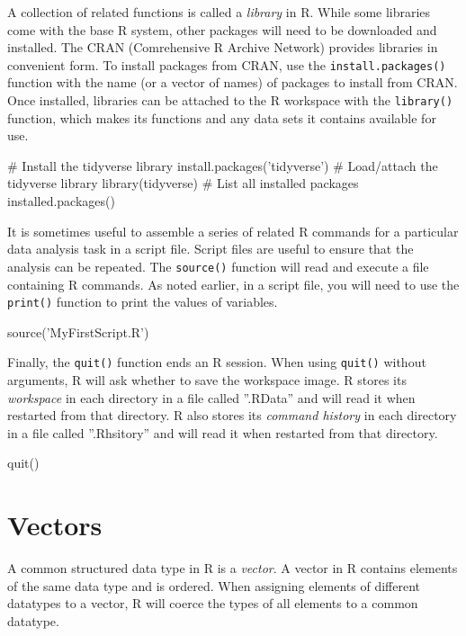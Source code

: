 A collection of related functions is called a \emph{library} in R. While some libraries come with the base R system, other packages will need to be downloaded and installed. The CRAN (Comrehensive R Archive Network) provides libraries in convenient form. To install packages from CRAN, use the \texttt{install.packages()} function with the name (or a vector of names) of packages to install from CRAN. Once installed, libraries can be attached to the R workspace with the \texttt{library()} function, which makes its functions and any data sets it contains available for use. 

\begin{Rcode}
# Install the tidyverse library
install.packages('tidyverse')
# Load/attach the tidyverse library
library(tidyverse)
# List all installed packages
installed.packages()
\end{Rcode}

It is sometimes useful to assemble a series of related R commands for a particular data analysis task in a script file. Script files are useful to ensure that the analysis can be repeated. The \texttt{source()} function will read and execute a file containing R commands. As noted earlier, in a script file, you will need to use the \texttt{print()} function to print the values of variables.

\begin{Rcode}
source('MyFirstScript.R')
\end{Rcode}

Finally, the \texttt{quit()} function ends an R session. When using \texttt{quit()} without arguments, R will ask whether to save the workspace image. R stores its \emph{workspace} in each directory in a file called ''.RData'' and will read it when restarted from that directory. R also stores its \emph{command history} in each directory in a file called ''.Rhsitory'' and will read it when restarted from that directory.

\begin{Rcode}
quit()
\end{Rcode}

\section{Vectors}

A common structured data type in R is a \emph{vector}. A vector in R contains elements of the same data type and is ordered. When assigning elements of different datatypes to a vector, R will coerce the types of all elements to a common datatype.

